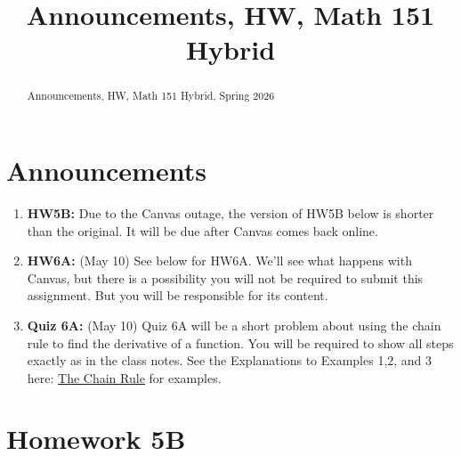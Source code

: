 \documentclass{ximera}
\title{Announcements, HW, Math 151 Hybrid}
\begin{document}
\begin{abstract}
Announcements, HW, Math 151 Hybrid, Spring 2026
\end{abstract}
\maketitle


\section{Announcements}
\begin{enumerate}
\item {\bf HW5B:} Due to the Canvas outage, the version of HW5B below is shorter than the original. It will be due after Canvas comes back online.

\item {\bf HW6A:} (May 10) See below for HW6A. We'll see what happens with Canvas, but there is a possibility you will not be required to submit this assignment. But you will be responsible for its content.

\item {\bf Quiz 6A:} (May 10) Quiz 6A will be a short problem about using the chain rule to find the derivative of a function. You will be required to show all steps exactly as in the class notes. See the Explanations to Examples 1,2, and 3 here: \href{https://ximera.osu.edu/calcone/Calculus1/ChainRule/ChainRule}{The Chain Rule} for examples.

\end{enumerate}


\section{Homework 5B}
\end{document}
